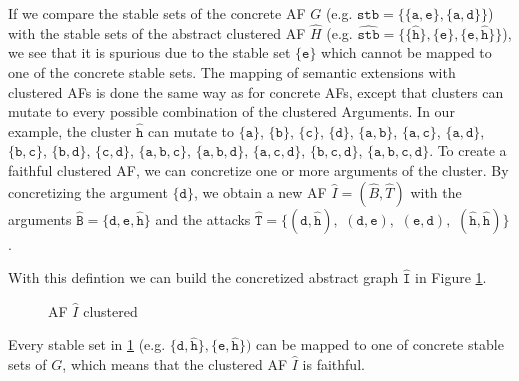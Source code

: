 If we compare the stable sets of the concrete AF $G$ (e.g. $\mathtt{stb=\{\{a, e\}, \{a, d\}\}}$) with the stable sets of the abstract clustered AF $\hat{H}$ (e.g. $\mathtt{\hat{stb}=\{\{\hat{h}\}, \{e\}, \{e, \hat{h}\}\}}$), we see that it is spurious due to the stable set $\mathtt{\{e\}}$ which cannot be mapped to one of the concrete stable sets. The mapping of semantic extensions with clustered AFs is done the same way as for concrete AFs, except that clusters can mutate to every possible combination of the clustered Arguments. In our example, the cluster $\mathtt{\hat{h}}$ can mutate to $\mathtt{\{a\}}$, $\mathtt{\{b\}}$, $\mathtt{\{c\}}$, $\mathtt{\{d\}}$, $\mathtt{\{a, b\}}$, $\mathtt{\{a, c\}}$, $\mathtt{\{a, d\}}$, $\mathtt{\{b, c\}}$, $\mathtt{\{b, d\}}$, $\mathtt{\{c, d\}}$, $\mathtt{\{a, b, c\}}$, $\mathtt{\{a, b, d\}}$, $\mathtt{\{a, c, d\}}$, $\mathtt{\{b, c, d\}}$, $\mathtt{\{a, b, c, d\}}$.
To create a faithful clustered AF, we can concretize one or more arguments of the cluster. By concretizing the argument $\mathtt{\{d\}}$, we obtain a new AF $\hat{I}=(\hat{B}, \hat{T})$ with the arguments $\mathtt{\hat{B}=\{d, e, \hat{h}\}}$ and the attacks $\mathtt{\hat{T}=\{(d, \hat{h}),}$
$\mathtt{(d, e),}$
$\mathtt{(e, d),}$
$\mathtt{(\hat{h}, \hat{h})\}}$.

With this defintion we can build the concretized abstract graph $\mathtt{\hat{I}}$ in Figure \ref{af:backgroundClusterExample3}.


\begin{figure}[h]
    \centering
    \caption{\ac{AF} $\hat{I}$ clustered}
    \label{af:backgroundClusterExample3}
\end{figure}

Every stable set in \ref{af:backgroundClusterExample3} (e.g. $\mathtt{\{d, \hat{h}\}, \{e, \hat{h}\}})$ can be mapped to one of concrete stable sets of $G$, which means that the clustered AF $\hat{I}$ is faithful.


